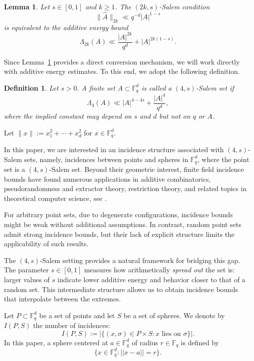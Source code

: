 \documentclass{article}
\newtheorem{lemma}[theorem]{Lemma}
\newtheorem{definition}[theorem]{Definition}
\begin{document}
\begin{lemma}\label{cor:equivalence-Salem-bound}
Let $s\in[0,1]$ and $k\ge1$. The $(2k,s)$-Salem condition
\[
\|\widehat{A}\|_{2k} \ll q^{-d}|A|^{1-s}
\]
is equivalent to the additive energy bound
\[
\Lambda_{2k}(A)
\ll
\frac{|A|^{2k}}{q^d}
+
|A|^{2k(1-s)}.
\]
\end{lemma}
Since Lemma~\ref{cor:equivalence-Salem-bound} provides a direct conversion mechanism, we will work directly with additive energy estimates. To this end, we adopt the following definition.
\begin{definition}\label{(4,s)-Salem-set}
Let $s > 0$. A finite set $A \subset \mathbb{F}_q^d$ is called a \emph{$(4,s)$-Salem set} if
\[
\Lambda_4(A) \ll |A|^{4 - 4s}+\frac{|A|^4}{q^d},
\]
where the implied constant may depend on $s$ and $d$ but not on $q$ or $A$.
\end{definition}

Let $\|x\| := x_1^2 + \cdots + x_d^2$ for $x \in \mathbb{F}_q^d$.

In this paper, we are interested in an incidence structure associated with $(4, s)$-Salem sets, namely, incidences between points and spheres in $\mathbb{F}_q^d$, where the point set is a $(4, s)$-Salem set. Beyond their geometric interest, finite field incidence bounds have found numerous applications in additive combinatorics, pseudorandomness and extractor theory, restriction theory, and related topics in theoretical computer science, see \cite{bkt, Zdvir, KPV21, Lewko19, MT04, MSS1}.

For arbitrary point sets, due to degenerate configurations, incidence bounds might be weak without additional assumptions. In contrast, random point sets admit strong incidence bounds, but their lack of explicit structure limits the applicability of such results.

The $(4, s)$-Salem setting provides a natural framework for bridging this gap. The parameter $s \in [0,1]$ measures how arithmetically \textit{spread out} the set is: larger values of $s$ indicate lower additive energy and behavior closer to that of a random set. This intermediate structure allows us to obtain incidence bounds that interpolate between the extremes.



Let $P \subset \mathbb{F}_q^d$ be a set of points and let $S$ be a set of spheres. We denote by $I(P,S)$ the number of incidences:
\[
I(P,S) := \bigl|\{(x,\sigma) \in P \times S : x \text{ lies on } \sigma\}\bigr|.
\]
In this paper, a sphere centered at $a\in \mathbb{F}_q^d$ of radius $r\in \mathbb{F}_q$ is defined by 
\[\{x\in \mathbb{F}_q^d\colon ||x-a||=r\}.\]
\end{document}
